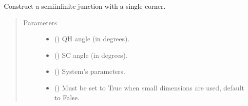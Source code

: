 \documentclass[letterpaper,10pt,english]{sphinxmanual}
\begin{document}

\begin{fulllineitems}
\label{\detokenize{modules:modules.system.DeviceSingleCorner}}
\pysigstartsignatures
{}
\pysigstopsignatures
\sphinxAtStartPar
Construct a semi\sphinxhyphen{}infinite junction with a single corner.
\begin{quote}\begin{description}
\item[{Parameters}] \leavevmode\begin{itemize}
\item {} 
\sphinxAtStartPar
{} () \textendash{} QH angle (in degrees).

\item {} 
\sphinxAtStartPar
{} () \textendash{} SC angle (in degrees).

\item {} 
\sphinxAtStartPar
{} () \textendash{} System’s parameters.

\item {} 
\sphinxAtStartPar
{} () \textendash{} Must be set to True when small dimensions are used,
default to False.

\end{itemize}

\end{description}\end{quote}


\end{fulllineitems}
\end{document}
